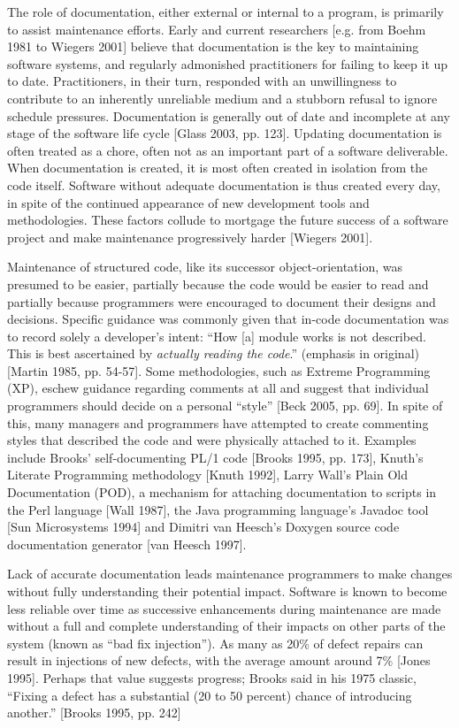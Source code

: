 The role of documentation, either external or internal to a program, is primarily to assist maintenance efforts. Early and current researchers [e.g. from Boehm 1981 to Wiegers 2001] believe that documentation is the key to maintaining software systems, and regularly admonished practitioners for failing to keep it up to date.  Practitioners, in their turn, responded with an unwillingness to contribute to an inherently unreliable medium and a stubborn refusal to ignore schedule pressures. Documentation is generally out of date and incomplete at any stage of the software life cycle [Glass 2003, pp. 123]. Updating documentation is often treated as a chore, often not as an important part of a software deliverable. When documentation is created, it is most often created in isolation from the code itself.  Software without adequate documentation is thus created every day, in spite of the continued appearance of new development tools and methodologies. These factors collude to mortgage the future success of a software project and make maintenance progressively harder [Wiegers 2001].

Maintenance of structured code, like its successor object-orientation, was presumed to be easier, partially because the code would be easier to read and partially because programmers were encouraged to document their designs and decisions. Specific guidance was commonly given that in-code documentation was to record solely a developer's intent:  ``How [a] module works is not described.  This is best ascertained by \textit{actually reading the code}.'' (emphasis in original) [Martin 1985, pp. 54-57].  Some methodologies, such as Extreme Programming (XP), eschew guidance regarding comments at all and suggest that individual programmers should decide on a personal ``style'' [Beck 2005, pp. 69].  In spite of this, many managers and programmers have attempted to create commenting styles that described the code and were physically attached to it.  Examples include Brooks' self-documenting PL/1 code [Brooks 1995, pp. 173], Knuth's Literate Programming methodology [Knuth 1992], Larry Wall's Plain Old Documentation (POD), a mechanism for attaching documentation to scripts in the Perl language [Wall 1987], the Java programming language's Javadoc tool [Sun Microsystems 1994] and Dimitri van Heesch's Doxygen source code documentation generator [van Heesch 1997].

Lack of accurate documentation leads maintenance programmers to make changes without fully understanding their potential impact.  Software is known to become less reliable over time as successive enhancements during maintenance are made without a full and complete understanding of their impacts on other parts of the system (known as ``bad fix injection'').  As many as 20\% of defect repairs can result in injections of new defects, with the average amount around 7\% [Jones 1995].  Perhaps that value suggests progress; Brooks said in his 1975 classic, ``Fixing a defect has a substantial (20 to 50 percent) chance of introducing another.'' [Brooks 1995, pp. 242]

